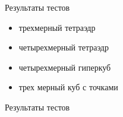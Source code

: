 \documentclass[]{beamer} %
\begin{document}
\begin{frame}{Результаты тестов}
    \begin{itemize}
        \item трехмерный тетраэдр
        \item четырехмерный тетраэдр
        \item четырехмерный гиперкуб
        \item трех мерный куб с точками

    \end{itemize}
\end{frame}


\begin{frame}{Результаты тестов}
\end{frame}
\end{document}
